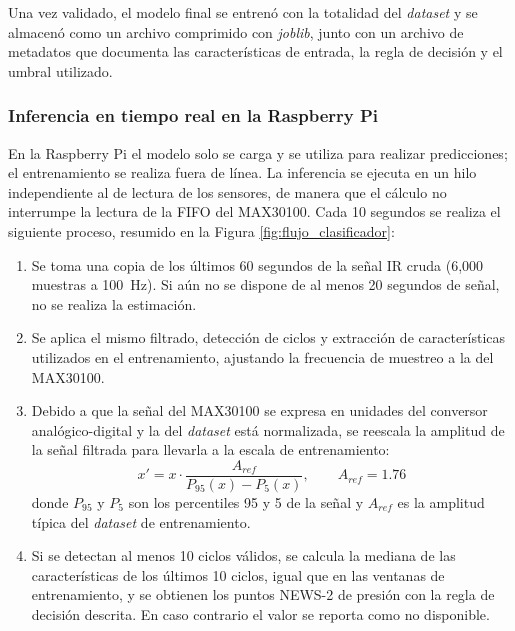 \documentclass[11pt,a4paper]{article}
\begin{document}
Una vez validado, el modelo final se entrenó con la totalidad del \textit{dataset} y se almacenó como un archivo comprimido con \textit{joblib}, junto con un archivo de metadatos que documenta las características de entrada, la regla de decisión y el umbral utilizado.

\subsubsection{Inferencia en tiempo real en la Raspberry Pi}

En la Raspberry Pi el modelo solo se carga y se utiliza para realizar predicciones; el entrenamiento se realiza fuera de línea. La inferencia se ejecuta en un hilo independiente al de lectura de los sensores, de manera que el cálculo no interrumpe la lectura de la FIFO del MAX30100. Cada 10 segundos se realiza el siguiente proceso, resumido en la Figura \ref{fig:flujo_clasificador}:

\begin{enumerate}
    \item Se toma una copia de los últimos 60 segundos de la señal IR cruda (6,000 muestras a 100~Hz). Si aún no se dispone de al menos 20 segundos de señal, no se realiza la estimación.
    \item Se aplica el mismo filtrado, detección de ciclos y extracción de características utilizados en el entrenamiento, ajustando la frecuencia de muestreo a la del MAX30100.
    \item Debido a que la señal del MAX30100 se expresa en unidades del conversor analógico-digital y la del \textit{dataset} está normalizada, se reescala la amplitud de la señal filtrada para llevarla a la escala de entrenamiento:
    \begin{equation}
        x' = x \cdot \frac{A_{ref}}{P_{95}(x) - P_{5}(x)}, \qquad A_{ref} = 1.76
    \end{equation}
    donde $P_{95}$ y $P_{5}$ son los percentiles 95 y 5 de la señal y $A_{ref}$ es la amplitud típica del \textit{dataset} de entrenamiento.
    \item Si se detectan al menos 10 ciclos válidos, se calcula la mediana de las características de los últimos 10 ciclos, igual que en las ventanas de entrenamiento, y se obtienen los puntos NEWS-2 de presión con la regla de decisión descrita. En caso contrario el valor se reporta como no disponible.
\end{enumerate}
\end{document}
